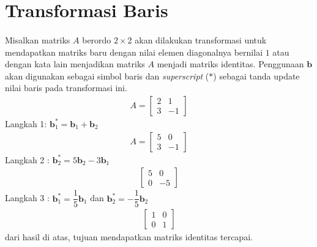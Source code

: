 		\section{Transformasi Baris}
		\paragraph*{} Misalkan matriks $A$ berordo $2\times2$ akan dilakukan transformasi untuk mendapatkan matriks baru dengan nilai elemen diagonalnya bernilai $1$ atau dengan kata lain menjadikan matriks $A$ menjadi matriks identitas. Penggunaan $\textbf{b}$ akan digunakan sebagai simbol baris dan \textit{superscript} ($*$) sebagai tanda update nilai baris pada transformasi ini.
		\begin{align*}
		A = \left[
		\begin{array}{rr} 
			2 & 1 \\
			3 & -1 
		\end{array} 
		\right]
		\end{align*}
		Langkah 1: $\textbf{b}^*_1= \textbf{b}_1 + \textbf{b}_2$ \\
		\begin{align*}
			A=\left[
			\begin{array}{rr} 
				5 & 0 \\
				3 & -1 
			\end{array} 
			\right]
		\end{align*}
		Langkah 2 : $\textbf{b}^*_2= 5\textbf{b}_2 - 3\textbf{b}_1$ \\
		\begin{align*}
			\left[
			\begin{array}{rr} 
				5 & 0 \\
				0 & -5 
			\end{array} 
			\right]
		\end{align*}
		Langkah 3 : $\textbf{b}^*_1= \dfrac{1}{5}\textbf{b}_1 $ dan $\textbf{b}^*_2= -\dfrac{1}{5}\textbf{b}_2$ \\
		\begin{align*}
			\left[
			\begin{array}{rr} 
				1 & 0 \\
				0 & 1
			\end{array} 
			\right]
		\end{align*}
		dari hasil di atas, tujuan mendapatkan matriks identitas tercapai. 
		

